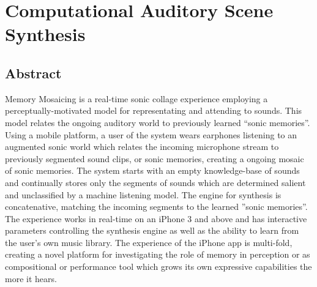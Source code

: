 \documentclass[a4paper,11pt,final]{ThesisStyle}
\begin{document}







\chapter{Computational Auditory Scene Synthesis}

\minitoc

\section{Abstract}

Memory Mosaicing is a real-time sonic collage experience employing a perceptually-motivated model for representating and attending to sounds. This model relates the ongoing auditory world to previously learned ``sonic memories''.  Using a mobile platform, a user of the system wears earphones listening to an augmented sonic world which relates the incoming microphone stream to previously segmented sound clips, or sonic memories, creating a ongoing mosaic of sonic memories.  The system starts with an empty knowledge-base of sounds and continually stores only the segments of sounds which are determined salient and unclassified by a machine listening model.  The engine for synthesis is concatenative, matching the incoming segments to the learned ''sonic memories''.  The experience works in real-time on an iPhone 3 and above and has interactive parameters controlling the synthesis engine as well as the ability to learn from the user's own music library.  The experience of the iPhone app is multi-fold, creating a novel platform for investigating the role of memory in perception or as compositional or performance tool which grows its own expressive capabilities the more it hears.
\end{document}
